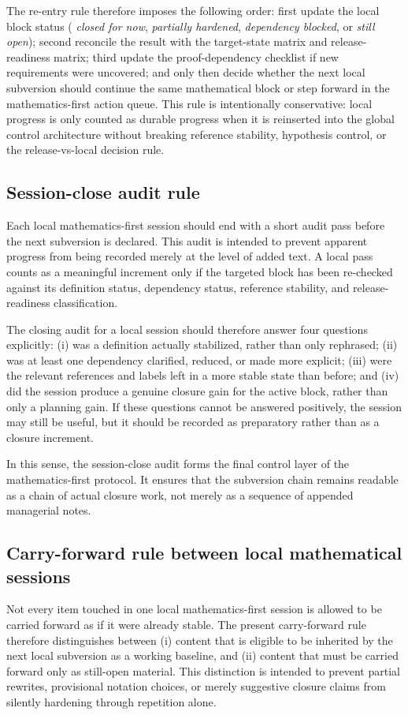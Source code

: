 The re-entry rule therefore imposes the following order: first update the local block status (
\emph{closed for now}, \emph{partially hardened}, \emph{dependency blocked}, or \emph{still open}); second reconcile the result with the target-state matrix and release-readiness matrix; third update the proof-dependency checklist if new requirements were uncovered; and only then decide whether the next local subversion should continue the same mathematical block or step forward in the mathematics-first action queue. This rule is intentionally conservative: local progress is only counted as durable progress when it is reinserted into the global control architecture without breaking reference stability, hypothesis control, or the release-vs-local decision rule.



\subsection*{Session-close audit rule}
Each local mathematics-first session should end with a short audit pass before the next subversion is declared. This audit is intended to prevent apparent progress from being recorded merely at the level of added text. A local pass counts as a meaningful increment only if the targeted block has been re-checked against its definition status, dependency status, reference stability, and release-readiness classification.

The closing audit for a local session should therefore answer four questions explicitly: (i) was a definition actually stabilized, rather than only rephrased; (ii) was at least one dependency clarified, reduced, or made more explicit; (iii) were the relevant references and labels left in a more stable state than before; and (iv) did the session produce a genuine closure gain for the active block, rather than only a planning gain. If these questions cannot be answered positively, the session may still be useful, but it should be recorded as preparatory rather than as a closure increment.

In this sense, the session-close audit forms the final control layer of the mathematics-first protocol. It ensures that the subversion chain remains readable as a chain of actual closure work, not merely as a sequence of appended managerial notes.


\subsection*{Carry-forward rule between local mathematical sessions}
Not every item touched in one local mathematics-first session is allowed to be carried forward as if it were already stable. The present carry-forward rule therefore distinguishes between (i) content that is eligible to be inherited by the next local subversion as a working baseline, and (ii) content that must be carried forward only as still-open material. This distinction is intended to prevent partial rewrites, provisional notation choices, or merely suggestive closure claims from silently hardening through repetition alone.


